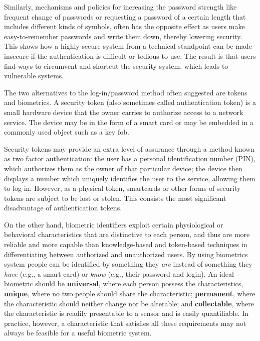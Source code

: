 \documentclass{article}
\begin{document}
Similarly, mechanisms and policies for increasing the password strength like frequent change of passwords or requesting a password of a certain length that includes different kinds of symbols, often has the opposite effect as users make easy-to-remember passwords and write them down, thereby lowering security.\cite{adams1999users} This shows how a highly secure system from a technical standpoint can be made insecure if the authentication is difficult or tedious to use. The result is that users find ways to circumvent and shortcut the security system, which leads to vulnerable systems. 

The two alternatives to the log-in/password method often suggested are tokens and biometrics. A security token (also sometimes called authentication token) is a small hardware device that the owner carries to authorize access to a network service. The device may be in the form of a smart card or may be embedded in a commonly used object such as a key fob. 

Security tokens may provide an extra level of assurance through a method known as two factor authentication: the user has a personal identification number (PIN), which authorizes them as the owner of that particular device; the device then displays a number which uniquely identifies the user to the service, allowing them to log in. However, as a physical token, smartcards or other forms of security tokens are subject to be lost or stolen. This consists the most significant disadvantage of authentication tokens.

On the other hand, biometric identifiers exploit certain physiological or behavioral characteristics that are distinctive to each person, and thus are more reliable and more capable than knowledge-based and token-based techniques in differentiating between authorized and unauthorized users. By using biometrics system people can be identified by something they \textit{are} instead of something they \textit{have} (e.g., a smart card) or \textit{know} (e.g., their password and login). An ideal biometric should be \textbf{universal}, where each person possess the characteristics, \textbf{unique}, where no two people should share the characteristic; \textbf{permanent}, where the characteristic should neither change nor be alterable; and \textbf{collectable}, where the characteristic is readily presentable to a sensor and is easily quantifiable.\cite{jain2000biometric} In practice, however, a characteristic that satisfies all these requirements may not always be feasible for a useful biometric system.
\end{document}
